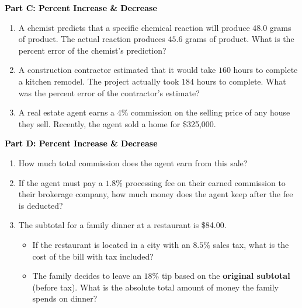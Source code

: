 \documentclass[12pt, letterpaper, fleqn]{article}
\begin{document}
\newpage

\begin{tcolorbox}[colback=customteal!20]
\large\textcolor{black}{\textbf{Part C: Percent Increase \& Decrease}}
\end{tcolorbox}

\vspace{3mm}

\begin{enumerate}[itemsep=4.2cm, leftmargin=0.6cm, resume]
\item A chemist predicts that a specific chemical reaction will produce $48.0$ grams of product. The actual reaction produces $45.6$ grams of product. What is the percent error of the chemist's prediction?
\item A construction contractor estimated that it would take $160$ hours to complete a kitchen remodel. The project actually took $184$ hours to complete. What was the percent error of the contractor's estimate?
\item A real estate agent earns a $4\%$ commission on the selling price of any house they sell. Recently, the agent sold a home for \$325,000.
\end{enumerate}

\newpage

\begin{tcolorbox}[colback=customteal!20]
\large\textcolor{black}{\textbf{Part D: Percent Increase \& Decrease}}
\end{tcolorbox}

\vspace{3mm}

\begin{enumerate}[itemsep=4.2cm, leftmargin=0.6cm, resume]
\item How much total commission does the agent earn from this sale?
\item If the agent must pay a $1.8\%$ processing fee on their earned commission to their brokerage company, how much money does the agent keep after the fee is deducted?
\item The subtotal for a family dinner at a restaurant is \$84.00. 
\begin{itemize}
\item If the restaurant is located in a city with an $8.5\%$ sales tax, what is the cost of the bill with tax included?
\item The family decides to leave an $18\%$ tip based on the \textbf{original subtotal} (before tax). What is the absolute total amount of money the family spends on dinner?
\end{itemize}
\end{enumerate}
\end{document}
